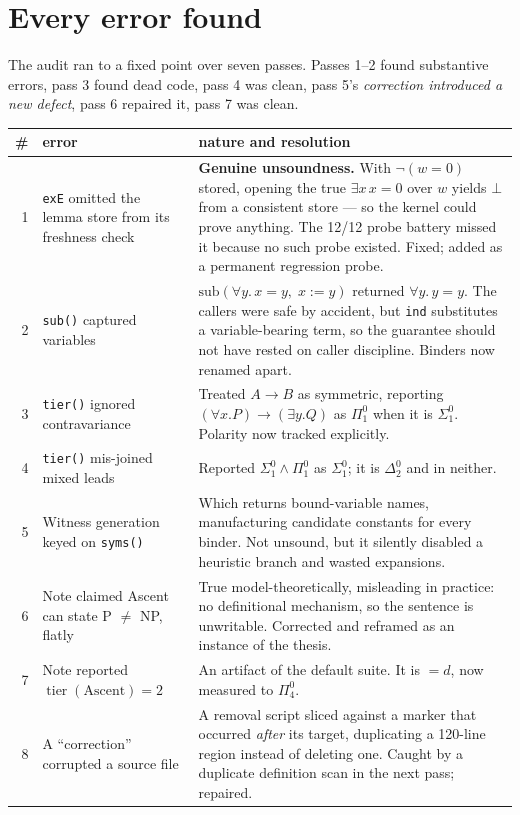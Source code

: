 \documentclass[11pt,a4paper]{article}
\newcommand{\Sig}[2]{\Sigma^{#1}_{#2}}
\newcommand{\Pai}[2]{\Pi^{#1}_{#2}}
\newcommand{\Del}[2]{\Delta^{#1}_{#2}}
\newcommand{\tier}{\operatorname{tier}}
\begin{document}
\section{Every error found}

The audit ran to a fixed point over seven passes. Passes 1--2 found substantive
errors, pass 3 found dead code, pass 4 was clean, pass 5's \emph{correction
introduced a new defect}, pass 6 repaired it, pass 7 was clean.

\begin{center}
\begin{longtable}{@{}rp{4.6cm}p{7.4cm}@{}}
\toprule
\# & error & nature and resolution \\
\midrule
\endhead
1 & \texttt{exE} omitted the lemma store from its freshness check &
\textbf{Genuine unsoundness.} With $\lnot(w{=}0)$ stored, opening the true
$\exists x\, x{=}0$ over $w$ yields $\bot$ from a consistent store --- so the
kernel could prove anything. The 12/12 probe battery missed it because no such
probe existed. Fixed; added as a permanent regression probe. \\
2 & \texttt{sub()} captured variables &
$\mathrm{sub}(\forall y.\, x{=}y,\; x := y)$ returned $\forall y.\, y{=}y$. The
callers were safe by accident, but \texttt{ind} substitutes a variable-bearing
term, so the guarantee should not have rested on caller discipline. Binders now
renamed apart. \\
3 & \texttt{tier()} ignored contravariance &
Treated $A \to B$ as symmetric, reporting $(\forall x.P) \to (\exists y.Q)$ as
$\Pai{0}{1}$ when it is $\Sig{0}{1}$. Polarity now tracked explicitly. \\
4 & \texttt{tier()} mis-joined mixed leads &
Reported $\Sig{0}{1} \wedge \Pai{0}{1}$ as $\Sig{0}{1}$; it is $\Del{0}{2}$ and
in neither. \\
5 & Witness generation keyed on \texttt{syms()} &
Which returns bound-variable names, manufacturing candidate constants for every
binder. Not unsound, but it silently disabled a heuristic branch and wasted
expansions. \\
6 & Note claimed Ascent can state P $\neq$ NP, flatly &
True model-theoretically, misleading in practice: no definitional mechanism, so
the sentence is unwritable. Corrected and reframed as an instance of the thesis. \\
7 & Note reported $\tier(\text{Ascent}) = 2$ &
An artifact of the default suite. It is $= d$, now measured to $\Pai{0}{4}$. \\
8 & A ``correction'' corrupted a source file &
A removal script sliced against a marker that occurred \emph{after} its target,
duplicating a 120-line region instead of deleting one. Caught by a duplicate
definition scan in the next pass; repaired. \\
\bottomrule
\end{longtable}
\end{center}
\end{document}

